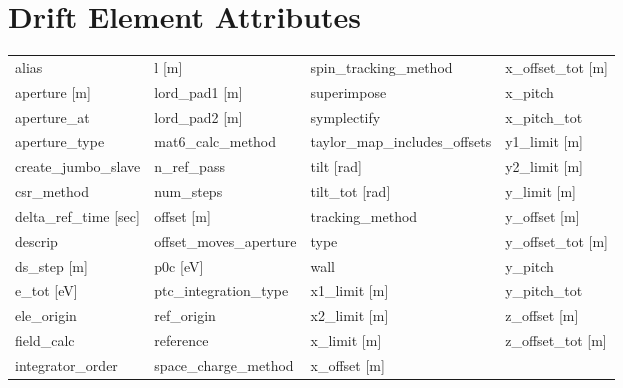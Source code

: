  \section{Drift Element Attributes}
 \label{s:list.drift}

 \begin{tabular}{llll} \toprule
alias                          & l [m]                          & spin_tracking_method           & x_offset_tot [m]               \\
aperture [m]                   & lord_pad1 [m]                  & superimpose                    & x_pitch                        \\
aperture_at                    & lord_pad2 [m]                  & symplectify                    & x_pitch_tot                    \\
aperture_type                  & mat6_calc_method               & taylor_map_includes_offsets    & y1_limit [m]                   \\
create_jumbo_slave             & n_ref_pass                     & tilt [rad]                     & y2_limit [m]                   \\
csr_method                     & num_steps                      & tilt_tot [rad]                 & y_limit [m]                    \\
delta_ref_time [sec]           & offset [m]                     & tracking_method                & y_offset [m]                   \\
descrip                        & offset_moves_aperture          & type                           & y_offset_tot [m]               \\
ds_step [m]                    & p0c [eV]                       & wall                           & y_pitch                        \\
e_tot [eV]                     & ptc_integration_type           & x1_limit [m]                   & y_pitch_tot                    \\
ele_origin                     & ref_origin                     & x2_limit [m]                   & z_offset [m]                   \\
field_calc                     & reference                      & x_limit [m]                    & z_offset_tot [m]               \\
integrator_order               & space_charge_method            & x_offset [m]                   &                                \\
 \bottomrule
 \end{tabular}
 \vfill

